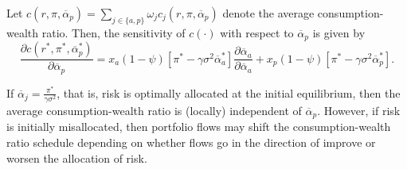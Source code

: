 Let $c(r, \pi, \overline{\alpha}_p) = \sum_{j\in\{a,p\}} \omega_j c_j(r, \pi, \overline{\alpha}_p)$ denote the average consumption-wealth ratio. Then, the sensitivity of $c(\cdot)$ with respect to $\overline{\alpha}_p$ is given by
\begin{equation}
    \frac{\partial c(r^*, \pi^*, \overline{\alpha}_p^*)}{\partial \overline{\alpha}_p} = x_a (1-\psi) \left[ \pi^*  - \gamma \sigma^2 \overline{\alpha}_a^*\right] \frac{\partial \overline{\alpha}_a}{\partial \overline{\alpha}_a} + 
    x_p (1-\psi) \left[ \pi^*  - \gamma \sigma^2 \overline{\alpha}_p^*\right].
\end{equation}

If $\overline{\alpha}_j = \frac{\pi^*}{\gamma \sigma^2} $, that is, risk is optimally allocated at the initial equilibrium, then the average consumption-wealth ratio is (locally) independent of $\overline{\alpha}_p$. However, if risk is initially misallocated, then portfolio flows may shift the consumption-wealth ratio schedule depending on whether flows go in the direction of improve or worsen the allocation of risk.

